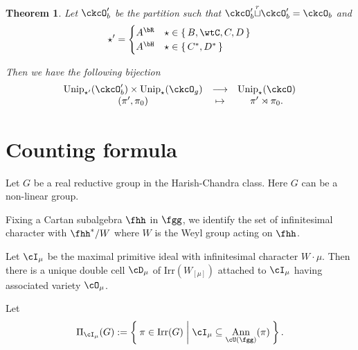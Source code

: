 \documentclass[12pt,a4paper]{amsart}
\def\abs#1{\left|{#1}\right|}
\DeclareMathOperator{\Ann}{Ann}
\numberwithin{equation}{section}
\newtheorem{thm}{Theorem}[section]
\theoremstyle{remark}
\def\unip{\mathrm{unip}}
\def\PI#1{\Pi_{\cI_{#1}}}
\def\Irr{\mathrm{Irr}}
\def\Unip{\mathrm{Unip}}
\def\dBV{d_{\mathrm{BV}}}
\def\cuprow{{\stackrel{r}{\sqcup}}}
\def\PBPes{\mathrm{PBP}^{\mathrm{ext}}_{\star}}
\begin{document}
\begin{thm}
  Let $\ckcO'_{b}$ be the partition such that $\ckcO'_{b}\cuprow \ckcO'_{b}
  = \ckcO_{b}$    %
  and
  \[\star' =
  \begin{cases}
     A^{\bR} & \star \in \set{B,\wtC,C,D}\\
     A^{\bH} & \star \in \set{C^{*},D^{*}}\\
    \end{cases}
  \]

  Then we have the following bijection
  \[
    \begin{array}{ccc}
    \Unip_{\star'}(\ckcO'_{b}) \times \Unip_{\star}(\ckcO_{g})
      & \longrightarrow & \Unip_{\star}(\ckcO)\\
      (\pi',\pi_{0})& \mapsto & \pi'\rtimes \pi_{0}.
    \end{array}
  \]
\end{thm}



\section{Counting formula}

Let $G$ be a real reductive group in the Harish-Chandra class.
Here $G$ can be a non-linear group.

Fixing a Cartan subalgebra $\fhh$ in $\fgg$,
we identify the set of infinitesimal character with $\fhh^{*}/W$
where $W$ is the Weyl group acting on $\fhh$.



Let $\cI_{\mu}$ be the maximal primitive ideal with infinitesimal character
$W\cdot \mu$. Then there is a unique double cell $\cD_{\mu}$
of $\Irr(W_{[\mu]})$ attached to
$\cI_{\mu}$ having associated variety $\cO_{\mu}$.

Let
\[
  \PI{\mu}(G):= \Set{\pi \in \Irr(G)| \cI_{\mu}
    \subseteq \Ann_{\cU(\fgg)}(\pi)}.
\]
\end{document}
